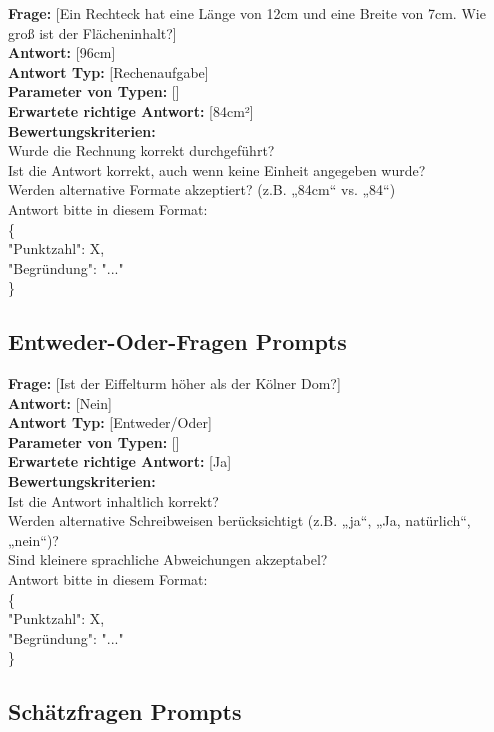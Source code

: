 \documentclass[a4paper,12pt]{article}
\begin{document}
\textbf{Frage:} [Ein Rechteck hat eine Länge von 12cm und eine Breite von 7cm. Wie groß ist der Flächeninhalt?] \\
\textbf{Antwort:} [96cm] \\
\textbf{Antwort Typ:} [Rechenaufgabe] \\
\textbf{Parameter von Typen:} [] \\
\textbf{Erwartete richtige Antwort:} [84cm²] \\
\textbf{Bewertungskriterien:} \\
Wurde die Rechnung korrekt durchgeführt? \\
Ist die Antwort korrekt, auch wenn keine Einheit angegeben wurde? \\
Werden alternative Formate akzeptiert? (z.B. „84cm“ vs. „84“) \\
Antwort bitte in diesem Format: \\
\{ \\
"Punktzahl": X, \\
"Begründung": "..." \\
\}

\subsection{Entweder-Oder-Fragen Prompts}

\textbf{Frage:} [Ist der Eiffelturm höher als der Kölner Dom?] \\
\textbf{Antwort:} [Nein] \\
\textbf{Antwort Typ:} [Entweder/Oder] \\
\textbf{Parameter von Typen:} [] \\
\textbf{Erwartete richtige Antwort:} [Ja] \\
\textbf{Bewertungskriterien:} \\
Ist die Antwort inhaltlich korrekt? \\
Werden alternative Schreibweisen berücksichtigt (z.B. „ja“, „Ja, natürlich“, „nein“)? \\
Sind kleinere sprachliche Abweichungen akzeptabel? \\
Antwort bitte in diesem Format: \\
\{ \\
"Punktzahl": X, \\
"Begründung": "..." \\
\}

\subsection{Schätzfragen Prompts}
\end{document}
